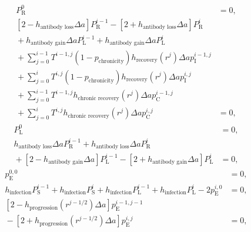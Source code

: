 \documentclass[12pt]{article}
\begin{document}
\begin{equation}
  \begin{split}
    P_{\mathrm{R}}^0 &= 0,
    \\
    \left[2 - h_{\text{antibody loss}} \Delta a\right]
    P_{\mathrm{R}}^{i - 1}
    - \left[2 + h_{\text{antibody loss}} \Delta a\right]
    P_{\mathrm{R}}^i
    \\ {}
    + h_{\text{antibody gain}} \Delta a P_{\mathrm{L}}^{i - 1}
    + h_{\text{antibody gain}} \Delta a P_{\mathrm{L}}^i
    \\ {}
    + \sum_{j = 0}^{i - 1}
    T^{i - 1, j} \left(1 - p_{\text{chronicity}}\right)
    h_{\text{recovery}}(r^j) \Delta a
    p_{\mathrm{I}}^{i - 1, j}
    \\ {}
    + \sum_{j = 0}^i
    T^{i, j} \left(1 - p_{\text{chronicity}}\right)
    h_{\text{recovery}}(r^j) \Delta a
    p_{\mathrm{I}}^{i, j}
    \\ {}
    + \sum_{j = 0}^{i - 1}
    T^{i - 1, j} h_{\text{chronic recovery}}(r^j) \Delta a
    p_{\mathrm{C}}^{i - 1, j}
    \\ {}
    + \sum_{j = 0}^i
    T^{i, j} h_{\text{chronic recovery}}(r^j) \Delta a
    p_{\mathrm{C}}^{i, j}
    &= 0,
  \end{split}
\end{equation}
\begin{equation}
  \begin{split}
    P_{\mathrm{L}}^0 &= 0,
    \\
    h_{\text{antibody loss}} \Delta a P_{\mathrm{R}}^{i - 1}
    + h_{\text{antibody loss}} \Delta a P_{\mathrm{R}}^i
    \\ {}
    + \left[2 - h_{\text{antibody gain}} \Delta a\right]
    P_{\mathrm{L}}^{i - 1}
    - \left[2 + h_{\text{antibody gain}} \Delta a\right]
    P_{\mathrm{L}}^i
    &= 0,
  \end{split}
\end{equation}
\begin{equation}
  \begin{split}
    p_{\mathrm{E}}^{0, 0} &= 0,
    \\
    h_{\text{infection}} P_{\mathrm{S}}^{i - 1}
    + h_{\text{infection}} P_{\mathrm{S}}^i
    + h_{\text{infection}} P_{\mathrm{L}}^{i - 1}
    + h_{\text{infection}} P_{\mathrm{L}}^i
    - 2 p_{\mathrm{E}}^{i, 0}
    &= 0,
    \\
    \left[2 - h_{\text{progression}}(r^{j - 1 / 2}) \Delta a\right]
    p_{\mathrm{E}}^{i - 1, j - 1}
    \\ {}
    - \left[2 + h_{\text{progression}}(r^{j - 1 / 2}) \Delta a\right]
    p_{\mathrm{E}}^{i, j}
    &= 0,
  \end{split}
\end{equation}
\end{document}
